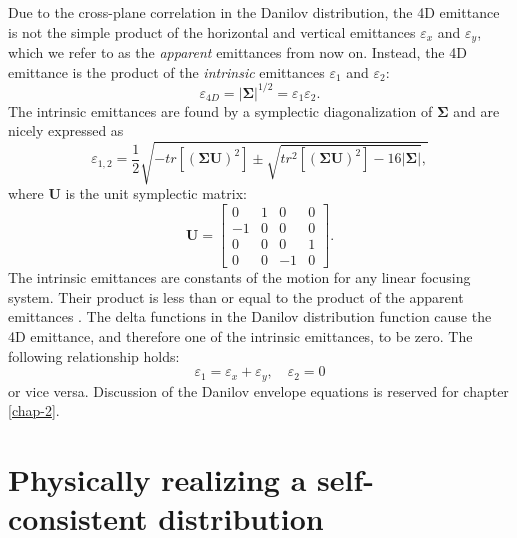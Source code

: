 Due to the cross-plane correlation in the Danilov distribution, the 4D emittance is not the simple product of the horizontal and vertical emittances $\varepsilon_x$ and $\varepsilon_y$, which we refer to as the \textit{apparent} emittances from now on. Instead, the 4D emittance is the product of the \textit{intrinsic} emittances $\varepsilon_1$ and $\varepsilon_2$:
%
\begin{equation} \label{eq:mode_emittances1}
    \varepsilon_{4D} = \left|{\bm{\Sigma}}\right|^{1/2} = \varepsilon_1\varepsilon_2.
\end{equation}
%
The intrinsic emittances are found by a symplectic diagonalization of $\bm{\Sigma}$ and are nicely expressed as \cite{Xiao2013}
%
\begin{equation}
    \varepsilon_{1, 2} = \frac{1}{2}\sqrt{
      -tr\left[(\bm{\Sigma} \mathbf{U})^2\right] \pm \sqrt{tr^2\left[(\bm{\Sigma} \mathbf{U})^2\right] - 16|{\bm{\Sigma}}|},
    }
\end{equation}
%
where $\mathbf{U}$ is the unit symplectic matrix:
%
\begin{equation}
    \mathbf{U} = 
    \begin{bmatrix}
        0 & 1 & 0 & 0 \\
        -1 & 0 & 0 & 0 \\
        0 & 0 & 0 & 1 \\
        0 & 0 & -1 & 0
    \end{bmatrix}.
\end{equation}
%
The intrinsic emittances are constants of the motion for any linear focusing system. Their product is less than or equal to the product of the apparent emittances \cite{Buon1993}. The delta functions in the Danilov distribution function cause the 4D emittance, and therefore one of the intrinsic emittances, to be zero. The following relationship holds:
%
\begin{equation} \label{eq:mode_emittances2}
    \varepsilon_1 = \varepsilon_x + \varepsilon_y, \quad
    \varepsilon_2 = 0
\end{equation}
%
or vice versa. Discussion of the Danilov envelope equations is reserved for chapter \ref{chap-2}.




\section{Physically realizing a self-consistent distribution}\label{sec:Physically realizing a self-consistent distribution}


